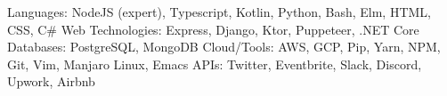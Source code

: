 
\begin{cvskills}

  \cvskill
    {Languages:}
    {NodeJS (expert), Typescript, Kotlin, Python, Bash, Elm, HTML, CSS, C\#}
   \cvskill
    {Web Technologies:}  
    {Express, Django, Ktor, Puppeteer, .NET Core}
   \cvskill
    {Databases:}  
    {PostgreSQL, MongoDB}
   \cvskill
    {Cloud/Tools:}  
    {AWS, GCP, Pip, Yarn, NPM, Git, Vim, Manjaro Linux, Emacs}
   \cvskill
    {APIs:}  
    {Twitter, Eventbrite, Slack, Discord, Upwork, Airbnb}
\end{cvskills}
